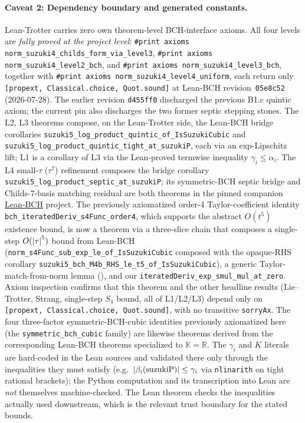 \paragraph{Caveat 2: Dependency boundary and generated constants.}
Lean-Trotter carries zero own theorem-level BCH-interface axioms. All
four levels are \emph{fully proved at the project level}:
\texttt{\#print axioms norm\_suzuki4\_childs\_form\_via\_level3},
\texttt{\#print axioms norm\_suzuki4\_level2\_bch}, and \texttt{\#print
axioms norm\_suzuki4\_level3\_bch}, together with
\texttt{\#print axioms norm\_suzuki4\_level4\_uniform}, each return only
\texttt{[propext, Classical.choice, Quot.sound]} at Lean-BCH
revision~\texttt{05e8c52} (2026-07-28). The earlier revision
\texttt{d455ff0} discharged the previous B1.c quintic axiom; the current
pin also discharges the two former septic stepping stones.
The L2, L3 theorems compose, on the Lean-Trotter side, the Lean-BCH
bridge corollaries
\texttt{suzuki5\_log\_product\_quintic\_of\_IsSuzukiCubic} and
\texttt{suzuki5\_log\_product\_quintic\_tight\_at\_suzukiP}, each via
an exp-Lipschitz lift; L1 is a corollary of L3 via the Lean-proved
termwise inequality $\gamma_i \le \alpha_i$. The L4 small-$\tau$
($\tau^7$) refinement composes the bridge corollary
\texttt{suzuki5\_log\_product\_septic\_at\_suzukiP}; its symmetric-BCH
septic bridge and Childs-7-basis matching residual are both theorems in
the pinned companion
\href{https://github.com/Jue-Xu/Lean-BCH}{Lean-BCH} project.
The previously axiomatized
order-4 Taylor-coefficient identity
\texttt{bch\_iteratedDeriv\_s4Func\_order4}, which supports the abstract
$O(t^5)$ existence bound, is now a theorem via a three-slice chain
that composes a single-step $O(\left|\tau\right|^5)$ bound from Lean-BCH
(\texttt{norm\_s4Func\_sub\_exp\_le\_of\_IsSuzukiCubic} composed with the
opaque-RHS corollary
\texttt{suzuki5\_bch\_M4b\_RHS\_le\_t5\_of\_IsSuzukiCubic}), a generic
Taylor-match-from-norm lemma
(),
and our \texttt{iteratedDeriv\_exp\_smul\_mul\_at\_zero}. Axiom
inspection confirms that this theorem and the other headline results
(Lie--Trotter, Strang, single-step $S_4$ bound, all of L1/L2/L3)
depend only on \texttt{[propext, Classical.choice, Quot.sound]}, with
no transitive \texttt{sorryAx}. The four three-factor
symmetric-BCH-cubic identities previously axiomatized here (the
\texttt{symmetric\_bch\_cubic} family) are likewise theorems derived
from the corresponding Lean-BCH theorems specialized to
$\mathbb{K} = \mathbb{R}$. The $\gamma_i$ and $K$ literals are hard-coded
in the Lean sources and validated there only through the inequalities they
must satisfy (e.g.\ $\left|\beta_i(\text{suzukiP})\right| \le \gamma_i$ via
\texttt{nlinarith} on tight rational brackets); the Python computation and
its transcription into Lean are \emph{not} themselves machine-checked.
The Lean theorem checks the inequalities actually used downstream, which is
the relevant trust boundary for the stated bounds.

